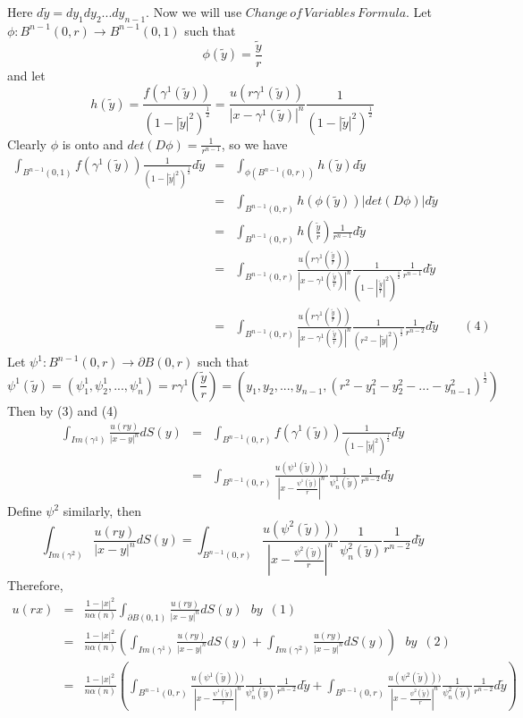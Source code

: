 \documentclass[a4paper,10pt]{article}
\begin{document}
Here $d\tilde{y}=dy_1dy_2 ... dy_{n-1}$.
Now we will use $Change \, of \, Variables \, Formula$. Let $\phi : B^{n-1}(0,r) \rightarrow B^{n-1}(0,1)$ such that $$\phi(\tilde{y})=\frac{\tilde{y}}{r}$$ and let $$h(\tilde{y})=\frac{f(\gamma^1(\tilde{y}))}{(1-|\tilde{y}|^2)^{\frac{1}{2}}}=\frac{u(r\gamma^1(\tilde{y}))}{|x-\gamma^1(\tilde{y})|^n}\frac{1}{(1-|\tilde{y}|^2)^{\frac{1}{2}}}$$ Clearly $\phi$ is onto and $det(D\phi)=\frac{1}{r^{n-1}}$, so we have 
\begin{eqnarray*}
    \int_{B^{n-1}(0,1)}f(\gamma^1(\tilde{y}))\frac{1}{(1-|\tilde{y}|^2)^{\frac{1}{2}}}d\tilde{y}
	&=&\int_{\phi(B^{n-1}(0,r))}h(\tilde{y})d\tilde{y}\\
	&=&\int_{B^{n-1}(0,r)}h(\phi(\tilde{y}))|det(D\phi)|d\tilde{y}\\
	&=&\int_{B^{n-1}(0,r)}h(\frac{\tilde{y}}{r})\frac{1}{r^{n-1}}d\tilde{y}\\
	&=&\int_{B^{n-1}(0,r)}\frac{u(r\gamma^1(\frac{\tilde{y}}{r}))}{|x-\gamma^1(\frac{\tilde{y}}{r})|^n}\frac{1}{(1-|\frac{\tilde{y}}{r}|^2)^{\frac{1}{2}}}\frac{1}{r^{n-1}}d\tilde{y}\\
	&=&\int_{B^{n-1}(0,r)}\frac{u(r\gamma^1(\frac{\tilde{y}}{r}))}{|x-\gamma^1(\frac{\tilde{y}}{r})|^n}\frac{1}{(r^2-|\tilde{y}|^2)^{\frac{1}{2}}}\frac{1}{r^{n-2}}d\tilde{y}	\qquad(4)
\end{eqnarray*}
Let $\psi^1:B^{n-1}(0,r)\rightarrow\partial B(0,r)$ such that $$\psi^1(\tilde{y})=(\psi^1_1,\psi^1_2,...,\psi^1_n)=r\gamma^1(\frac{\tilde{y}}{r})=(y_1,y_2,...,y_{n-1},(r^2-y_1^2-y_2^2-...-y_{n-1}^2)^{\frac{1}{2}})$$ 
Then by (3) and (4) \begin{eqnarray*}
\int_{Im(\gamma^1)}\frac{u(ry)}{|x-y|^n}dS(y)&=&\int_{B^{n-1}(0,r)}f(\gamma^1(\tilde{y}))\frac{1}{(1-|\tilde{y}|^2)^{\frac{1}{2}}}d\tilde{y}\\
&=&\int_{B^{n-1}(0,r)}\frac{u(\psi^1(\tilde{y})))}{|x-\frac{\psi^1(\tilde{y})}{r}|^n}\frac{1}{\psi^1_n(\tilde{y})}\frac{1}{r^{n-2}}d\tilde{y}	
\end{eqnarray*}
Define $ \psi^2$ similarly, then
$$\int_{Im(\gamma^2)}\frac{u(ry)}{|x-y|^n}dS(y)=\int_{B^{n-1}(0,r)}\frac{u(\psi^2(\tilde{y})))}{|x-\frac{\psi^2(\tilde{y})}{r}|^n}\frac{1}{\psi^2_n(\tilde{y})}\frac{1}{r^{n-2}}d\tilde{y}$$
Therefore, 
\begin{eqnarray*}
	u(rx)&=&\frac{1-|x|^2}{n\alpha(n)}\int_{\partial B(0,1)}\frac{u(ry)}{|x-y|^n}dS(y) \,\,\,\, by\,\,\, (1)\\
	&=&\frac{1-|x|^2}{n\alpha(n)}(\int_{Im(\gamma^1)}\frac{u(ry)}{|x-y|^n}dS(y)+\int_{Im(\gamma^2)}\frac{u(ry)}{|x-y|^n}dS(y)) \,\,\, \, by\,\,\,(2) \\
	&=&\frac{1-|x|^2}{n\alpha(n)}(\int_{B^{n-1}(0,r)}\frac{u(\psi^1(\tilde{y})))}{|x-\frac{\psi^1(\tilde{y})}{r}|^n}\frac{1}{\psi^1_n(\tilde{y})}\frac{1}{r^{n-2}}d\tilde{y}+\int_{B^{n-1}(0,r)}\frac{u(\psi^2(\tilde{y})))}{|x-\frac{\psi^2(\tilde{y})}{r}|^n}\frac{1}{\psi^2_n(\tilde{y})}\frac{1}{r^{n-2}}d\tilde{y})
\end{eqnarray*}
\end{document}
